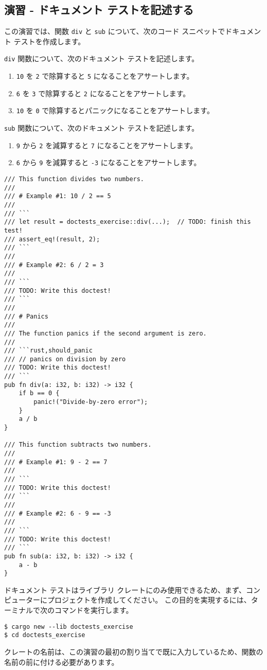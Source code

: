 \subsection{演習 - ドキュメント テストを記述する}

この演習では、関数 \texttt{div} と \texttt{sub} について、次のコード スニペットでドキュメント テストを作成します。

\texttt{div} 関数について、次のドキュメント テストを記述します。

\begin{enumerate}
\item \texttt{10} を \texttt{2} で除算すると \texttt{5} になることをアサートします。
\item \texttt{6} を \texttt{3} で除算すると \texttt{2} になることをアサートします。
\item \texttt{10} を \texttt{0} で除算するとパニックになることをアサートします。
\end{enumerate}

\texttt{sub} 関数について、次のドキュメント テストを記述します。

\begin{enumerate}
\item \texttt{9} から \texttt{2} を減算すると \texttt{7} になることをアサートします。
\item \texttt{6} から \texttt{9} を減算すると \texttt{-3} になることをアサートします。
\end{enumerate}

\begin{lstlisting}[numbers=none]
/// This function divides two numbers.
///
/// # Example #1: 10 / 2 == 5
///
/// ```
/// let result = doctests_exercise::div(...);  // TODO: finish this test!
/// assert_eq!(result, 2);
/// ```
///
/// # Example #2: 6 / 2 = 3
///
/// ```
/// TODO: Write this doctest!
/// ```
///
/// # Panics
///
/// The function panics if the second argument is zero.
///
/// ```rust,should_panic
/// // panics on division by zero
/// TODO: Write this doctest!
/// ```
pub fn div(a: i32, b: i32) -> i32 {
    if b == 0 {
        panic!("Divide-by-zero error");
    }
    a / b
}

/// This function subtracts two numbers.
///
/// # Example #1: 9 - 2 == 7
///
/// ```
/// TODO: Write this doctest!
/// ```
///
/// # Example #2: 6 - 9 == -3
///
/// ```
/// TODO: Write this doctest!
/// ```
pub fn sub(a: i32, b: i32) -> i32 {
    a - b
}
\end{lstlisting}

ドキュメント テストはライブラリ クレートにのみ使用できるため、まず、コンピューターにプロジェクトを作成してください。 この目的を実現するには、ターミナルで次のコマンドを実行します。

\begin{lstlisting}[numbers=none]
$ cargo new --lib doctests_exercise
$ cd doctests_exercise
\end{lstlisting}

クレートの名前は、この演習の最初の割り当てで既に入力しているため、関数の名前の前に付ける必要があります。

